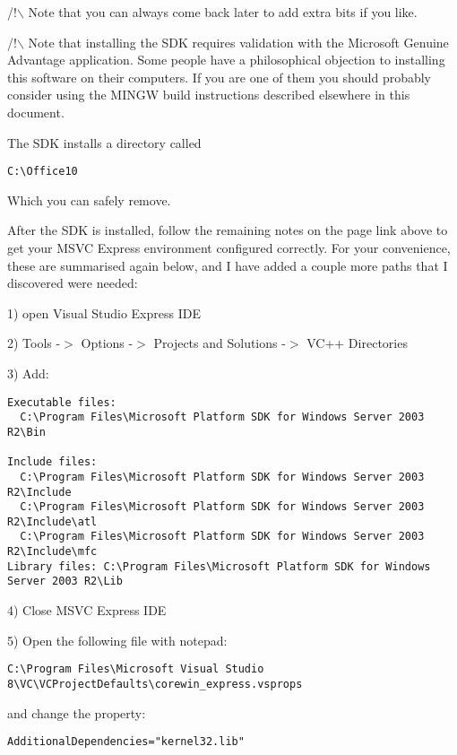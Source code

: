 /!$\backslash$ Note that you can always come back later to add extra bits if you like.

/!$\backslash$ Note that installing the SDK requires validation with the 
Microsoft Genuine Advantage application. Some people have a philosophical 
objection to installing this software on their computers. If you are one 
of them you should probably consider using the MINGW build instructions 
described elsewhere in this document.

The SDK installs a directory called

\begin{verbatim}
C:\Office10
\end{verbatim}

Which you can safely remove.

After the SDK is installed, follow the remaining notes on the page link 
above to get your MSVC Express environment configured correctly. For your 
convenience, these are summarised again below, and I have added a couple 
more paths that I discovered were needed:

1) open Visual Studio Express IDE

2) Tools -$>$ Options -$>$ Projects and Solutions -$>$ VC++ Directories

3) Add:

\begin{verbatim}
Executable files: 
  C:\Program Files\Microsoft Platform SDK for Windows Server 2003 R2\Bin

Include files: 
  C:\Program Files\Microsoft Platform SDK for Windows Server 2003 R2\Include
  C:\Program Files\Microsoft Platform SDK for Windows Server 2003 R2\Include\atl
  C:\Program Files\Microsoft Platform SDK for Windows Server 2003 R2\Include\mfc
Library files: C:\Program Files\Microsoft Platform SDK for Windows Server 2003 R2\Lib
\end{verbatim}

4) Close MSVC Express IDE

5) Open the following file with notepad:

\begin{verbatim}
C:\Program Files\Microsoft Visual Studio 8\VC\VCProjectDefaults\corewin_express.vsprops
\end{verbatim}

and change the property:

\begin{verbatim}
AdditionalDependencies="kernel32.lib"
\end{verbatim}

